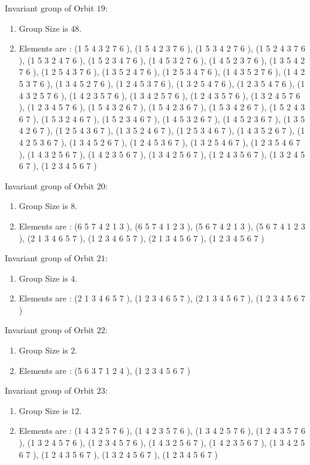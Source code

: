 \documentclass[12pt]{article}
\begin{document}
Invariant group of Orbit $19$:
\begin{enumerate}
\item Group Size is $48$.
\item Elements are : (1 5 4 3 2 7 6  ), (1 5 4 2 3 7 6  ), (1 5 3 4 2 7 6  ), (1 5 2 4 3 7 6  ), (1 5 3 2 4 7 6  ), (1 5 2 3 4 7 6  ), (1 4 5 3 2 7 6  ), (1 4 5 2 3 7 6  ), (1 3 5 4 2 7 6  ), (1 2 5 4 3 7 6  ), (1 3 5 2 4 7 6  ), (1 2 5 3 4 7 6  ), (1 4 3 5 2 7 6  ), (1 4 2 5 3 7 6  ), (1 3 4 5 2 7 6  ), (1 2 4 5 3 7 6  ), (1 3 2 5 4 7 6  ), (1 2 3 5 4 7 6  ), (1 4 3 2 5 7 6  ), (1 4 2 3 5 7 6  ), (1 3 4 2 5 7 6  ), (1 2 4 3 5 7 6  ), (1 3 2 4 5 7 6  ), (1 2 3 4 5 7 6  ), (1 5 4 3 2 6 7  ), (1 5 4 2 3 6 7  ), (1 5 3 4 2 6 7  ), (1 5 2 4 3 6 7  ), (1 5 3 2 4 6 7  ), (1 5 2 3 4 6 7  ), (1 4 5 3 2 6 7  ), (1 4 5 2 3 6 7  ), (1 3 5 4 2 6 7  ), (1 2 5 4 3 6 7  ), (1 3 5 2 4 6 7  ), (1 2 5 3 4 6 7  ), (1 4 3 5 2 6 7  ), (1 4 2 5 3 6 7  ), (1 3 4 5 2 6 7  ), (1 2 4 5 3 6 7  ), (1 3 2 5 4 6 7  ), (1 2 3 5 4 6 7  ), (1 4 3 2 5 6 7  ), (1 4 2 3 5 6 7  ), (1 3 4 2 5 6 7  ), (1 2 4 3 5 6 7  ), (1 3 2 4 5 6 7  ), (1 2 3 4 5 6 7  )
\end{enumerate}
Invariant group of Orbit $20$:
\begin{enumerate}
\item Group Size is $8$.
\item Elements are : (6 5 7 4 2 1 3  ), (6 5 7 4 1 2 3  ), (5 6 7 4 2 1 3  ), (5 6 7 4 1 2 3  ), (2 1 3 4 6 5 7  ), (1 2 3 4 6 5 7  ), (2 1 3 4 5 6 7  ), (1 2 3 4 5 6 7  )
\end{enumerate}
Invariant group of Orbit $21$:
\begin{enumerate}
\item Group Size is $4$.
\item Elements are : (2 1 3 4 6 5 7  ), (1 2 3 4 6 5 7  ), (2 1 3 4 5 6 7  ), (1 2 3 4 5 6 7  )
\end{enumerate}
Invariant group of Orbit $22$:
\begin{enumerate}
\item Group Size is $2$.
\item Elements are : (5 6 3 7 1 2 4  ), (1 2 3 4 5 6 7  )
\end{enumerate}
Invariant group of Orbit $23$:
\begin{enumerate}
\item Group Size is $12$.
\item Elements are : (1 4 3 2 5 7 6  ), (1 4 2 3 5 7 6  ), (1 3 4 2 5 7 6  ), (1 2 4 3 5 7 6  ), (1 3 2 4 5 7 6  ), (1 2 3 4 5 7 6  ), (1 4 3 2 5 6 7  ), (1 4 2 3 5 6 7  ), (1 3 4 2 5 6 7  ), (1 2 4 3 5 6 7  ), (1 3 2 4 5 6 7  ), (1 2 3 4 5 6 7  )
\end{enumerate}
\end{document}
